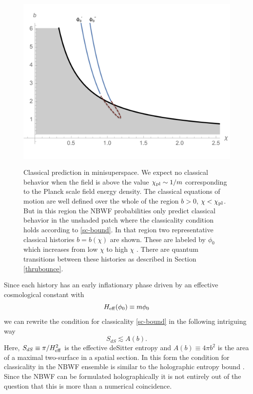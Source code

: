 \documentclass[prd,floats,superscriptaddress,eqsecnum,floatfix,nofootinbib,12pt]{revtex4}
\def\p0{\phi_0}
\def\be{\begin{equation}}
\def\ee{\end{equation}}
\def\zf{}
\def\p0{\phi_0}
\begin{document}
{{%
\begin{figure}[t]
\includegraphics[height=3.6in]{classbound.pdf} 
\caption{Classical prediction in minisuperspace.   We expect no classical behavior when the field is above the value $\chi_{\rm pl}\sim1/m$ corresponding to the Planck scale field energy density. The classical equations of motion are well defined over the whole of the region  $b>0$, $\chi<\chi_{\rm pl}$. But in this region the NBWF probabilities only predict classical behavior in the unshaded patch where the classicality condition holds according to \eqref{sc-bound}. In that region two representative classical histories $b=b(\chi)$ are shown. These are labeled by $\p0$ which increases from low $\chi$ to high $\chi$ . There are quantum transitions between these histories as described in Section \ref{thrubounce}. }
\label{scbound}
\end{figure}

Since each history has an early inflationary phase driven by an effective cosmological constant with
\be
H_{\rm eff}(\p0) \equiv m\p0
\label{effH}
\ee
we can rewrite the condition for classicality \eqref{sc-bound} in the following intriguing way
\be
S_{dS} \lesssim A(b).
\label{areabnd}
\ee
Here, $S_{dS} \equiv \pi /H_{\rm eff}^2$ is the {\zf effective} deSitter entropy \cite{GH77} and $A(b) \equiv 4\pi b^2$ is the area of a maximal two-surface in a spatial section. In this form the condition for classicality in the NBWF ensemble is similar to the holographic entropy bound
\cite{Bous02}. Since the NBWF can be formulated holographically \cite{HH11b} it is not entirely out of the question that this is more than a numerical coincidence. 

}}
\end{document}
